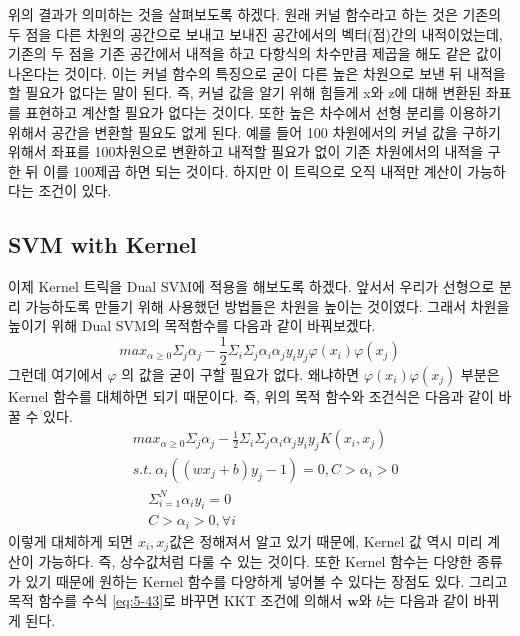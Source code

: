 \documentclass[a4paper]{oblivoir}
\begin{document}
\indent 위의 결과가 의미하는 것을 살펴보도록 하겠다. 원래 커널 함수라고 하는 것은 기존의 두 점을 다른 차원의 공간으로 보내고 보내진 공간에서의 벡터(점)간의 내적이었는데, 기존의 두 점을 기존 공간에서 내적을 하고 다항식의 차수만큼 제곱을 해도 같은 값이 나온다는 것이다. 이는 커널 함수의 특징으로 굳이 다른 높은 차원으로 보낸 뒤 내적을 할 필요가 없다는 말이 된다. 즉, 커널 값을 알기 위해 힘들게 x와 z에 대해 변환된 좌표를 표현하고 계산할 필요가 없다는 것이다. 또한 높은 차수에서 선형 분리를 이용하기 위해서 공간을 변환할 필요도 없게 된다. 예를 들어 100 차원에서의 커널 값을 구하기 위해서 좌표를 100차원으로 변환하고 내적할 필요가 없이 기존 차원에서의 내적을 구한 뒤 이를 100제곱 하면 되는 것이다. 하지만 이 트릭으로 오직 내적만 계산이 가능하다는 조건이 있다.\\

\subsection{SVM with Kernel}
\indent 이제 Kernel 트릭을 Dual SVM에 적용을 해보도록 하겠다. 앞서서 우리가 선형으로 분리 가능하도록 만들기 위해 사용했던 방법들은 차원을 높이는 것이였다. 그래서 차원을 높이기 위해 Dual SVM의 목적함수를 다음과 같이 바꿔보겠다.
\begin{equation}
max_{\alpha\geq 0} \Sigma_j \alpha_j -\frac{1}{2}\Sigma_i \Sigma_j \alpha_i \alpha_j y_i y_j \varphi(x_i)\varphi(x_j)
\label{eq:5-42}
\end{equation}
그런데 여기에서 $\varphi$ 의 값을 굳이 구할 필요가 없다. 왜냐하면 $\varphi(x_i)\varphi(x_j)$ 부분은 Kernel 함수를 대체하면 되기 때문이다. 즉, 위의 목적 함수와 조건식은 다음과 같이 바꿀 수 있다.
\begin{equation}
\begin{split}
&max_{\alpha\geq 0} \Sigma_j \alpha_j -\frac{1}{2}\Sigma_i \Sigma_j \alpha_i \alpha_j y_i y_j K(x_i,x_j)\\
&s.t.\ \alpha_i ((wx_j+b)y_j-1)=0,C>\alpha_i>0\\
&\ \ \ \ \ \Sigma_{i=1}^{N} \alpha_i y_i =0\\
&\ \ \ \ \ C>\alpha_i>0,\forall i
\end{split}
\label{eq:5-43}
\end{equation}
이렇게 대체하게 되면 $x_i,x_j$값은 정해져서 알고 있기 때문에, Kernel 값 역시 미리 계산이 가능하다. 즉, 상수값처럼 다룰 수 있는 것이다. 또한 Kernel 함수는 다양한 종류가 있기 때문에 원하는 Kernel 함수를 다양하게 넣어볼 수 있다는 장점도 있다. 그리고 목적 함수를 수식 \eqref{eq:5-43}로 바꾸면 KKT 조건에 의해서 $\mathbf{w}$와 $b$는 다음과 같이 바뀌게 된다.
\end{document}

